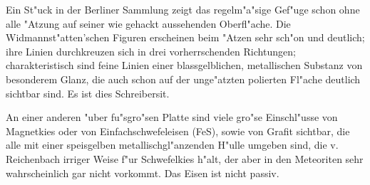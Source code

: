 \documentclass[a4paper, 11pt, oneside]{article}
\begin{document}
Ein St"uck in der Berliner Sammlung zeigt das regelm"a"sige Gef"uge schon ohne alle "Atzung auf seiner wie gehackt aussehenden Oberfl"ache. Die Widmannst"atten'schen Figuren erscheinen beim "Atzen sehr sch"on und deutlich; ihre Linien durchkreuzen sich in drei vorherrschenden Richtungen; charakteristisch sind feine Linien einer blassgelblichen, metallischen Substanz von besonderem Glanz, die auch schon auf der unge"atzten polierten Fl"ache deutlich sichtbar sind. Es ist dies Schreibersit.

An einer anderen "uber fu"sgro"sen Platte sind viele gro"se Einschl"usse von Magnetkies oder von Einfachschwefeleisen (FeS), sowie von Grafit sichtbar, die alle mit einer speisgelben metallischgl"anzenden H"ulle umgeben sind, die v. Reichenbach irriger Weise f"ur Schwefelkies h"alt, der aber in den Meteoriten sehr wahrscheinlich gar nicht vorkommt. Das Eisen ist nicht passiv.
\end{document}

